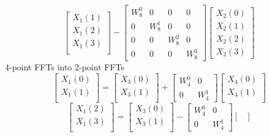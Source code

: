 \documentclass[journal,12pt,twocolumn]{IEEEtran}
\renewcommand\thesection{\arabic{section}}
\begin{document}
\begin{enumerate}[label=\arabic*.,ref=\thesection.\theenumi]
\begin{equation}
\begin{bmatrix}
		X_{1}(1)\\ 
		X_{1}(2)\\
		X_{1}(3)\\
	\end{bmatrix}
	-
	\begin{bmatrix}
		W^{0}_{8} & 0 & 0 & 0\\
		0 & W^{1}_{8} & 0 & 0\\
		0 & 0 & W^{2}_{8} & 0\\
		0 & 0 & 0 & W^{3}_{8}
	\end{bmatrix}
	\begin{bmatrix}
		X_{2}(0) \\ 
		X_{2}(1) \\ 
		X_{2}(2) \\
		X_{2}(3)
	\end{bmatrix}
\end{equation}
4-point FFTs into 2-point FFTs
\begin{equation}
	\begin{bmatrix}
		X_{1}(0) \\ 
		X_{1}(1)\\ 
	\end{bmatrix}
	=
	\begin{bmatrix}
		X_{3}(0) \\ 
		X_{3}(1)\\ 
	\end{bmatrix}
	+
	\begin{bmatrix}
		W^{0}_{4} & 0\\
		0 & W^{1}_{4}
	\end{bmatrix}
	\begin{bmatrix}
		X_{4}(0) \\ 
		X_{4}(1) \\ 
	\end{bmatrix}
\end{equation}
\begin{equation}
	\begin{bmatrix}
		X_{1}(2) \\ 
		X_{1}(3)\\ 
	\end{bmatrix}
	=
	\begin{bmatrix}
		X_{3}(0) \\ 
		X_{3}(1)\\ 
	\end{bmatrix}
	-
	\begin{bmatrix}
		W^{0}_{4} & 0\\
		0 & W^{1}_{4}
	\end{bmatrix}
	\begin{bmatrix}

\end{bmatrix}
\end{equation}
\end{enumerate}
\end{document}
